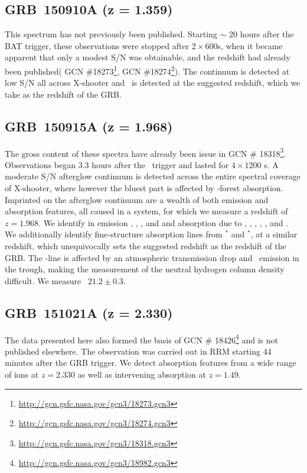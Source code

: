 \documentclass{aa}    %
\begin{document}
\subsection{GRB~150910A (z = 1.359)}	

This spectrum has not previously been published. Starting $\sim$ 20 hours after
the BAT trigger, these observations were stopped after $2 \times 600$s, when it
became apparent that only a modest S/N was obtainable, and the redshift had
already been published( GCN
\#18273\footnote{\url{http://gcn.gsfc.nasa.gov/gcn3/18273.gcn3}}, GCN
\#18274\footnote{\url{http://gcn.gsfc.nasa.gov/gcn3/18274.gcn3}}).  The
continuum is detected at low S/N all across X-shooter and \mgii~is detected at
the suggested redshift, which we take as the redshift of the GRB.

\subsection{GRB~150915A (z = 1.968)}	

The gross content of these spectra have already been issue in GCN \#
18318\footnote{\url{http://gcn.gsfc.nasa.gov/gcn3/18318.gcn3}}. Observations
began 3.3 hours after the \swift~trigger and lasted for $4 \times 1200$ s. A
moderate S/N afterglow continuum is detected across the entire spectral coverage
of X-shooter, where however the bluest part is affected by \lya-forest
absorption. Imprinted on the afterglow continuum are a wealth of both emission
and absorption features, all caused in a system, for which we measure a redshift
of $z = 1.968$. We identify in emission \oii, \hb, \oiii, and \ha and absorption
due to \lya, \civ, \alii, \SIii, \feii, and \mgii. We additionally identify
fine-structure absorption lines from \SIii$^*$ and \feii$^*$, at a similar
redshift, which unequivocally sets the suggested redshift as the redshift of the
GRB. The \lya-line is affected by an atmospheric transmission drop and
\lya~emission in the trough, making the measurement of the neutral hydrogen
column density difficult. We measure \nh~$21.2 \pm 0.3$.

\subsection{GRB~151021A (z = 2.330)}
The data presented here also formed the basis of GCN \#
18426\footnote{\url{http://gcn.gsfc.nasa.gov/gcn3/18982.gcn3}} and is not
published elsewhere. The observation was carried out in RRM starting 44 minutes
after the GRB trigger. We detect absorption features from a wide range of ions
at $z=2.330$ as well as intervening absorption at $z=1.49$.
\end{document}
